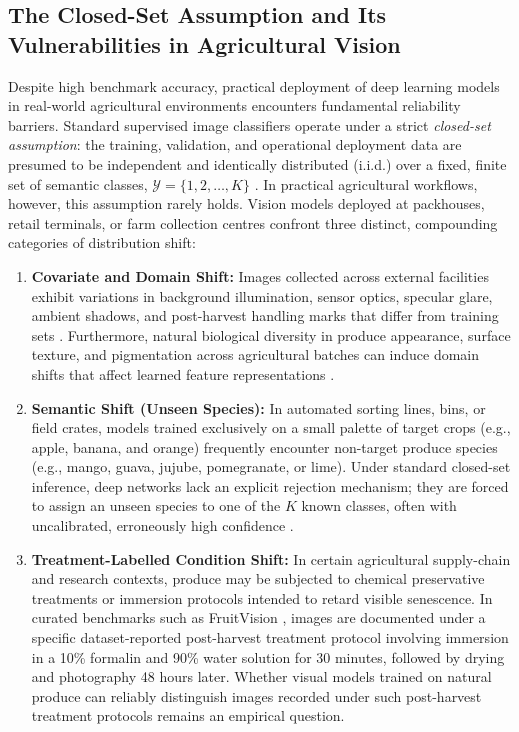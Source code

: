 \subsection{The Closed-Set Assumption and Its Vulnerabilities in Agricultural Vision}
\label{sec:closed_set_vulnerabilities}
Despite high benchmark accuracy, practical deployment of deep learning models in real-world agricultural environments encounters fundamental reliability barriers. Standard supervised image classifiers operate under a strict \textit{closed-set assumption}: the training, validation, and operational deployment data are presumed to be independent and identically distributed (i.i.d.) over a fixed, finite set of semantic classes, $\mathcal{Y} = \{1, 2, \dots, K\}$ \cite{guo2017calibration,hendrycks2017baseline}. In practical agricultural workflows, however, this assumption rarely holds. Vision models deployed at packhouses, retail terminals, or farm collection centres confront three distinct, compounding categories of distribution shift:

\begin{enumerate}
\item \textbf{Covariate and Domain Shift:} Images collected across external facilities exhibit variations in background illumination, sensor optics, specular glare, ambient shadows, and post-harvest handling marks that differ from training sets \cite{rizzo2023fruit,chen2024classification,abayomi2024fruitq,sultana2022extensive}. Furthermore, natural biological diversity in produce appearance, surface texture, and pigmentation across agricultural batches can induce domain shifts that affect learned feature representations \cite{sultana2022extensive,bijoy2025fruitvision}.
\item \textbf{Semantic Shift (Unseen Species):} In automated sorting lines, bins, or field crates, models trained exclusively on a small palette of target crops (e.g., apple, banana, and orange) frequently encounter non-target produce species (e.g., mango, guava, jujube, pomegranate, or lime). Under standard closed-set inference, deep networks lack an explicit rejection mechanism; they are forced to assign an unseen species to one of the $K$ known classes, often with uncalibrated, erroneously high confidence \cite{guo2017calibration,hendrycks2017baseline}.
\item \textbf{Treatment-Labelled Condition Shift:} In certain agricultural supply-chain and research contexts, produce may be subjected to chemical preservative treatments or immersion protocols intended to retard visible senescence. In curated benchmarks such as FruitVision \cite{bijoy2025fruitvision}, images are documented under a specific dataset-reported post-harvest treatment protocol involving immersion in a 10\% formalin and 90\% water solution for 30 minutes, followed by drying and photography 48 hours later. Whether visual models trained on natural produce can reliably distinguish images recorded under such post-harvest treatment protocols remains an empirical question.
\end{enumerate}

